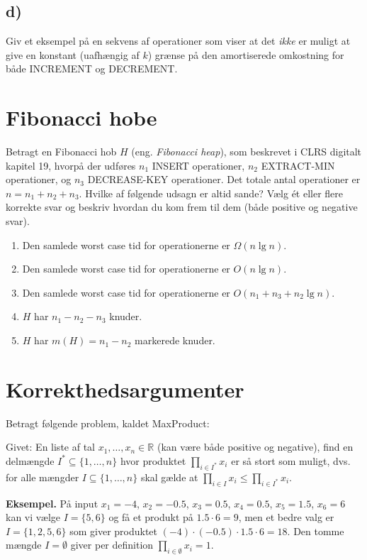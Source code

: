\documentclass{article}
\theoremstyle{definition}
\begin{document}
\subsection*{d)} Giv et eksempel på en sekvens af operationer som viser at det \textit{ikke} er muligt at give en konstant (uafhængig af $k$) grænse på den amortiserede omkostning for både INCREMENT og DECREMENT.

\section{Fibonacci hobe}

Betragt en Fibonacci hob $H$ (eng. \textit{Fibonacci heap}), som beskrevet i CLRS digitalt kapitel 19, hvorpå der udføres $n_1$ INSERT operationer, $n_2$ EXTRACT-MIN operationer, og $n_3$ DECREASE-KEY operationer. Det totale antal operationer er $n = n_1 + n_2 + n_3$. Hvilke af følgende udsagn er altid sande? Vælg ét eller flere korrekte svar og beskriv hvordan du kom frem til dem (både positive og negative svar).

\begin{enumerate}
    \item Den samlede worst case tid for operationerne er $\Omega(n\lg n)$.
    \item Den samlede worst case tid for operationerne er $O(n\lg n)$.
    \item Den samlede worst case tid for operationerne er $O(n_1 + n_3 + n_2\lg n)$.
    \item $H$ har $n_1 - n_2 - n_3$ knuder.
    \item $H$ har $m(H) = n_1 - n_2$ markerede knuder.
\end{enumerate}

\section{Korrekthedsargumenter}

Betragt følgende problem, kaldet MaxProduct:

Givet: En liste af tal $x_1,\ldots,x_n \in \mathbb{R}$ (kan være både positive og negative), find en delmængde $I^* \subseteq \{1,\ldots,n\}$ hvor produktet $\prod_{i\in I^*} x_i$ er så stort som muligt, dvs. for alle mængder $I \subseteq \{1,\ldots,n\}$ skal gælde at $\prod_{i\in I} x_i \leq \prod_{i\in I^*} x_i$.

\textbf{Eksempel.} På input $x_1 = -4$, $x_2 = -0.5$, $x_3 = 0.5$, $x_4 = 0.5$, $x_5 = 1.5$, $x_6 = 6$ kan vi vælge $I = \{5,6\}$ og få et produkt på $1.5 \cdot 6 = 9$, men et bedre valg er $I = \{1,2,5,6\}$ som giver produktet $(-4) \cdot (-0.5) \cdot 1.5 \cdot 6 = 18$. Den tomme mængde $I = \emptyset$ giver per definition $\prod_{i\in\emptyset} x_i = 1$.
\end{document}
